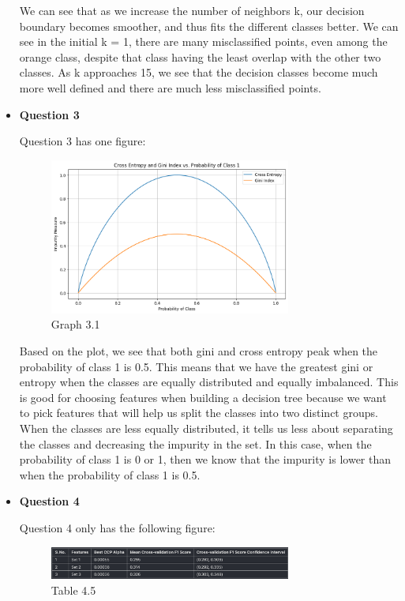 \documentclass[12pt]{article}
\begin{document}
\begin{itemize}
  We can see that as we increase the number of neighbors k, our decision boundary becomes smoother, and thus fits the different classes better. 
  We can see in the initial k = 1, there are many misclassified points, even among the orange class, despite that class having the least overlap with the other two classes. As k approaches 15, we see that the decision classes become much more well defined and there are much less misclassified points.

  \item \textbf{Question 3}
  
  Question 3 has one figure: \\ 
  \begin{figure} [H]
    \centering 
    \includegraphics[width=0.75\textwidth]{3_1.png}
    \caption{Graph 3.1}
    \label{fig:graph3.1}
  \end{figure}

  Based on the plot, we see that both gini and cross entropy peak when the probability of class 1 is 0.5. This means that we have the greatest gini or entropy when the classes are equally distributed and equally imbalanced. This is good for choosing features when building a decision tree because we want to pick 
  features that will help us split the classes into two distinct groups. When the classes are less equally distributed, it tells us less about separating the classes and decreasing the impurity in the set. In this case, when the probability of class 1 is 0 or 1, then we know that the impurity is lower than when the probability of class 1 is 0.5.
  

  \item \textbf{Question 4}
  
  Question 4 only has the following figure: \\ 


  \begin{figure}[H]
    \centering
    \includegraphics[width=0.75\textwidth]{4_5.png}
    \caption{Table 4.5}
    \label{fig:graph4.5}
  \end{figure}


\end{itemize}
\end{document}
